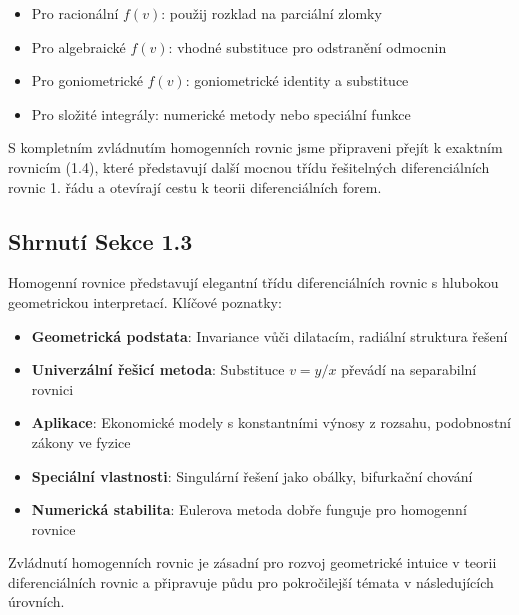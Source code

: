 \vspace{0.6\baselineskip}

\begin{remark}
\begin{itemize}
\item Pro racionální $f(v)$: použij rozklad na parciální zlomky
\item Pro algebraické $f(v)$: vhodné substituce pro odstranění odmocnin
\item Pro goniometrické $f(v)$: goniometrické identity a substituce
\item Pro složité integrály: numerické metody nebo speciální funkce
\end{itemize}
\end{remark}

\vspace{0.8\baselineskip}

\begin{transition}
S kompletním zvládnutím homogenních rovnic jsme připraveni přejít k exaktním rovnicím (1.4), které představují další mocnou třídu řešitelných diferenciálních rovnic 1. řádu a otevírají cestu k teorii diferenciálních forem.
\end{transition}

\vspace{0.8\baselineskip}

\subsection*{Shrnutí Sekce 1.3}

Homogenní rovnice představují elegantní třídu diferenciálních rovnic s hlubokou geometrickou interpretací. Klíčové poznatky:

\begin{itemize}
\item \textbf{Geometrická podstata}: Invariance vůči dilatacím, radiální struktura řešení
\item \textbf{Univerzální řešicí metoda}: Substituce $v = y/x$ převádí na separabilní rovnici
\item \textbf{Aplikace}: Ekonomické modely s konstantními výnosy z rozsahu, podobnostní zákony ve fyzice
\item \textbf{Speciální vlastnosti}: Singulární řešení jako obálky, bifurkační chování
\item \textbf{Numerická stabilita}: Eulerova metoda dobře funguje pro homogenní rovnice
\end{itemize}

Zvládnutí homogenních rovnic je zásadní pro rozvoj geometrické intuice v teorii diferenciálních rovnic a připravuje půdu pro pokročilejší témata v následujících úrovních.




